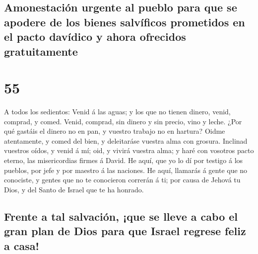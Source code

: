 \hypertarget{amonestaciuxf3n-urgente-al-pueblo-para-que-se-apodere-de-los-bienes-salvuxedficos-prometidos-en-el-pacto-davuxeddico-y-ahora-ofrecidos-gratuitamente}{%
\subsection{Amonestación urgente al pueblo para que se apodere de los
bienes salvíficos prometidos en el pacto davídico y ahora ofrecidos
gratuitamente}\label{amonestaciuxf3n-urgente-al-pueblo-para-que-se-apodere-de-los-bienes-salvuxedficos-prometidos-en-el-pacto-davuxeddico-y-ahora-ofrecidos-gratuitamente}}

\hypertarget{section-54}{%
\section{55}\label{section-54}}

 A todos los sedientos: Venid á las aguas; y los que no
tienen dinero, venid, comprad, y comed. Venid, comprad, sin dinero y sin
precio, vino y leche.  ¿Por qué gastáis el dinero no en pan,
y vuestro trabajo no en hartura? Oidme atentamente, y comed del bien, y
deleitaráse vuestra alma con grosura.  Inclinad vuestros
oídos, y venid á mí; oid, y vivirá vuestra alma; y haré con vosotros
pacto eterno, las misericordias firmes á David.  He aquí,
que yo lo dí por testigo á los pueblos, por jefe y por maestro á las
naciones.  He aquí, llamarás á gente que no conociste, y
gentes que no te conocieron correrán á ti; por causa de Jehová tu Dios,
y del Santo de Israel que te ha honrado.

\hypertarget{frente-a-tal-salvaciuxf3n-que-se-lleve-a-cabo-el-gran-plan-de-dios-para-que-israel-regrese-feliz-a-casa}{%
\subsection{Frente a tal salvación, ¡que se lleve a cabo el gran plan de
Dios para que Israel regrese feliz a
casa!}\label{frente-a-tal-salvaciuxf3n-que-se-lleve-a-cabo-el-gran-plan-de-dios-para-que-israel-regrese-feliz-a-casa}}

